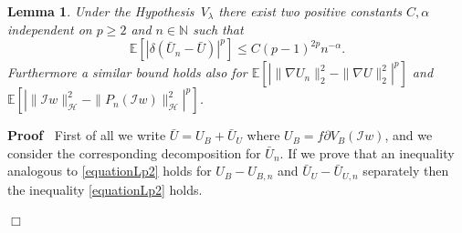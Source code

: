 \documentclass[a4paper,10pt]{article}
\newenvironment{proof}{\noindent\textbf{Proof\ }}{\hspace*{\fill}$\Box$\medskip}
\newtheorem{lemma}{Lemma}
\begin{document}
\begin{lemma}
  \label{lemma_inequality2}Under the Hypothesis~$V_{\lambda}$ there exist two
  positive constants $C, \alpha$ independent on $p \geqslant 2$ and $n \in
  \mathbb{N}$ such that
  \begin{equation}
    \mathbb{E} [| \delta (\bar{U}_n - \bar{U}) |^p] \leqslant C (p - 1)^{2 p}
    n^{- \alpha} . \label{equationLp2}
  \end{equation}
  Furthermore a similar bound holds also for $\mathbb{E} [| \| \nabla U_n
  \|^2_2 -\| \nabla U\|^2_2 |^p]$ and $\mathbb{E} [| \|
  \mathcal{I}w\|^2_{\mathcal{H}} -\|P_n (\mathcal{I}w) \|^2_{\mathcal{H}}
  |^p]$.
\end{lemma}

\begin{proof}
  First of all we write $\bar{U} = U_B + \bar{U}_U$ where $U_B = f \partial
  V_B (\mathcal{I}w)$, and we consider the corresponding decomposition for
  $\bar{U}_n$. If we prove that an inequality analogous to
  {\eqref{equationLp2}} holds for $U_B - U_{B, n}$ and $\bar{U}_U -
  \bar{U}_{U, n}$ separately then the inequality {\eqref{equationLp2}} holds.
  

\end{proof}
\end{document}
